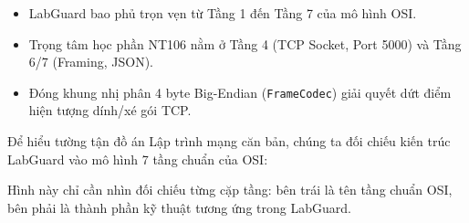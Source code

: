 \documentclass[12pt,a4paper]{article}
\begin{document}
\begin{summarybox}
\begin{itemize}[leftmargin=1.5em, itemsep=1pt]
  \item LabGuard bao phủ trọn vẹn từ Tầng 1 đến Tầng 7 của mô hình OSI.
  \item Trọng tâm học phần NT106 nằm ở Tầng 4 (TCP Socket, Port 5000) và Tầng 6/7 (Framing, JSON).
  \item Đóng khung nhị phân 4 byte Big-Endian (\texttt{FrameCodec}) giải quyết dứt điểm hiện tượng dính/xé gói TCP.
\end{itemize}
\end{summarybox}

Để hiểu tường tận đồ án Lập trình mạng căn bản, chúng ta đối chiếu kiến trúc LabGuard vào mô hình 7 tầng chuẩn của OSI:

Hình này chỉ cần nhìn đối chiếu từng cặp tầng: bên trái là tên tầng chuẩn OSI, bên phải là thành phần kỹ thuật tương ứng trong LabGuard.
\end{document}
